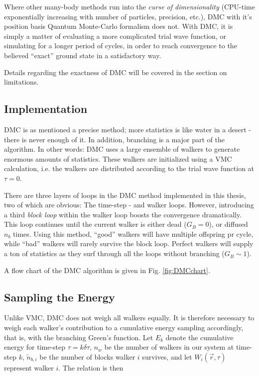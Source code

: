 Where other many-body methods run into the \textit{curse of dimensionality} (CPU-time exponentially increasing with number of particles, precision, etc.), DMC with it's position basis Quantum Monte-Carlo formalism does not. With DMC, it is simply a matter of evaluating a more complicated trial wave function, or simulating for a longer period of cycles, in order to reach convergence to the believed ``exact'' ground state in a satisfactory way.

Details regarding the exactness of DMC will be covered in the section on limitations.

\subsection{Implementation}

DMC is as mentioned a precise method; more statistics is like water in a desert - there is never enough of it. In addition, branching is a major part of the algorithm. In other words: DMC uses a large ensemble of walkers to generate enormous amounts of statistics. These walkers are initialized using a VMC calculation, i.e. the walkers are distributed according to the trial wave function at $\tau=0$. 

There are three layers of loops in the DMC method implemented in this thesis, two of which are obvious: The time-step - and walker loops. However, introducing a third \textit{block loop} within the walker loop boosts the convergence dramatically. This loop continues until the current walker is either dead ($G_B = 0$), or diffused $n_b$ times. Using this method, ``good'' walkers will have multiple offspring pr cycle, while ``bad'' walkers will rarely survive the block loop. Perfect walkers will supply a ton of statistics as they surf through all the loops without branching ($G_B \sim 1$).

A flow chart of the DMC algorithm is given in Fig. \ref{fig:DMCchart}. 

\subsection{Sampling the Energy}

Unlike VMC, DMC does not weigh all walkers equally. It is therefore necessary to weigh each walker's contribution to a cumulative energy sampling accordingly, that is, with the branching Green's function. Let $E_k$ denote the cumulative energy for time-step $\tau = k\delta\tau$, $n_w$ be the number of walkers in our system at time-step $k$, $\tilde n_{b,i}$ be the number of blocks walker $i$ survives, and let $W_i(\vec r, \tau)$ represent walker $i$. The relation is then

